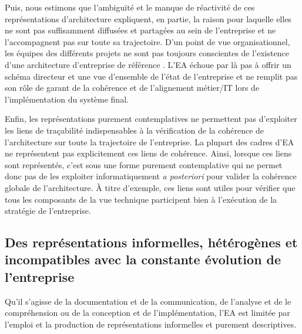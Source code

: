 Puis, nous estimons que l'ambiguïté et le manque de réactivité de ces
représentations d'architecture expliquent, en partie, la raison pour laquelle
elles ne sont pas suffisamment diffusées et partagées au sein de l'entreprise
et ne l'accompagnent pas sur toute sa trajectoire. D'un point de vue
organisationnel, les équipes des différents projets ne sont pas toujours
conscientes de l'existence d'une architecture d'entreprise de référence
\cite{shah2007frameworks}. L'EA échoue par là pas à offrir un schéma directeur
et une vue d'ensemble de l'état de l'entreprise et ne remplit pas son rôle de
garant de la cohérence et de l'alignement métier/IT lors de l'implémentation du
système final.

 Enfin, les représentations purement contemplatives ne permettent pas
d'exploiter les liens de traçabilité indispensables à la vérification de la
cohérence de l'architecture sur toute la trajectoire de l'entreprise. La
plupart des cadres d'EA ne représentent pas explicitement ces liens de
cohérence. Ainsi, lorsque ces liens sont représentés, c'est sous une forme
purement contemplative qui ne permet donc pas de les exploiter informatiquement
\textit{a posteriori} pour valider la cohérence globale de l'architecture. À
titre d'exemple, ces liens sont utiles pour vérifier que tous les composants de
la vue technique participent bien à l'exécution de la stratégie de
l'entreprise.

\subsection{Des représentations informelles, hétérogènes et incompatibles avec
la constante évolution de l'entreprise}
Qu'il s'agisse de la documentation et de la
communication, de l'analyse et de le compréhension ou de la conception
et de l'implémentation, l'EA est limitée par l'emploi et la production de
représentations informelles et purement descriptives.

